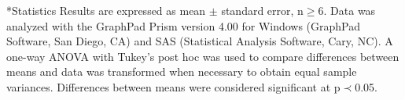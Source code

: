 \documentclass[12pt]{article}
\makeatletter
\renewcommand\subsubsection{\@startsection
	{subsubsection}{2}{0mm}
	{-0.05in}
	{-0.5\baselineskip}
	{\normalfont\normalsize\itshape}}
\renewcommand\section{\@startsection
	{subsection}{2}{0mm}
	{-0.2in}
	{0.05\baselineskip}
	{\normalfont\large\bfseries}}
\makeatother
\begin{document}
\subsubsection*{Statistics}
Results are expressed as mean $\pm$ standard error, n$\geq$6. Data was analyzed with the GraphPad Prism version 4.00 for Windows (GraphPad Software, San Diego, CA) and SAS (Statistical Analysis Software, Cary, NC). A one-way ANOVA with Tukey's post hoc was used to compare differences between means and data was transformed when necessary to obtain equal sample variances. Differences between means were considered significant at p$\prec$0.05.


\clearpage
% 
%



\clearpage
\end{document}
